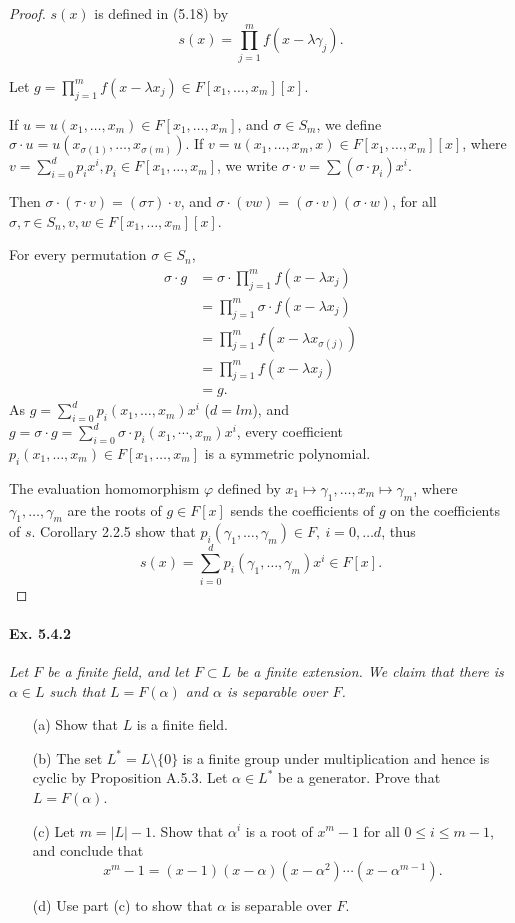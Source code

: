 \documentclass[11pt,a4paper]{article}
\begin{document}
\begin{proof}
$s(x)$ is defined in (5.18) by
 $$s(x) =\prod_{j=1}^m f(x-\lambda \gamma_j).$$

Let $g= \prod\limits_{j=1}^m f(x-\lambda x_j) \in F[x_1,\ldots,x_m][x]$.

If $u = u(x_1,\ldots,x_m) \in F[x_1,\ldots,x_m]$, and $\sigma \in S_m$, we define $\sigma \cdot u =u(x_{\sigma(1)},\ldots,x_{\sigma(m)})$. If $v =u(x_1,\ldots,x_m,x) \in F[x_1,\ldots,x_m][x]$, where $v = \sum\limits_{i=0}^d p_i x^i, p_i \in F[x_1,\ldots,x_m]$, we write $\sigma \cdot v = \sum (\sigma \cdot p_i) x^i$. 

Then $\sigma\cdot(\tau \cdot  v )= (\sigma \tau) \cdot v$, and $\sigma\cdot (vw) = (\sigma\cdot v) (\sigma\cdot w)$, for all $\sigma,\tau \in S_n, v,w \in F[x_1,\ldots,x_m][x]$.

For every permutation $\sigma \in S_n$, 
\begin{align*}
\sigma \cdot g &= \sigma \cdot  \prod_{j=1}^m f(x-\lambda x_j)\\
&= \prod_{j=1}^m \sigma \cdot f(x-\lambda x_j)\\
&=\prod_{j=1}^m f(x-\lambda x_{\sigma(j)})\\
&=\prod_{j=1}^m f(x-\lambda x_j)\\
&=g.
\end{align*}
As $g = \sum\limits_{i=0}^d p_i(x_1,\ldots,x_m) x^i$ ($d = lm$), and $g = \sigma \cdot g = \sum\limits_{i=0}^d \sigma \cdot p_i(x_1,\cdots,x_m) x^i$, every coefficient $p_i(x_1,\ldots,x_m)\in F[x_1,\ldots,x_m]$ is a symmetric polynomial. 

The evaluation homomorphism $\varphi$ defined by $x_1\mapsto \gamma_1,\ldots, x_m \mapsto \gamma_m$, where $\gamma_1,\ldots,\gamma_m$ are the roots of $g \in F[x]$ sends the coefficients of $g$ on the coefficients of $s$. Corollary 2.2.5 show that $p_i(\gamma_1,\dots,\gamma_m) \in F,\  i=0,\ldots d$, thus $$s(x) =\sum\limits_{i=0}^d p_i(\gamma_1,\ldots,\gamma_m) x^i \in F[x].$$
\end{proof}

\paragraph{Ex. 5.4.2}

{\it Let $F$ be a finite field, and let $F \subset L$ be a finite extension. We claim that there is $\alpha \in L$ such that $L = F(\alpha)$ and $\alpha$ is separable over $F$.
\begin{enumerate}
\item[(a)] Show that $L$ is a finite field.
\item[(b)] The set $L^* = L \setminus \{0\}$ is a finite group under multiplication and hence is cyclic by Proposition A.5.3. Let $\alpha \in L^*$ be a generator. Prove that $L = F(\alpha)$.
\item[(c)] Let $m = |L| - 1$. Show that $\alpha^i$ is a root of $x^m-1$ for all $0\leq i\leq m-1$, and conclude that
$$x^m-1 = (x-1)(x-\alpha)(x-\alpha^2)\cdots(x-\alpha^{m-1}).$$
\item[(d)] Use part (c) to show that $\alpha$ is separable over $F$.
\end{enumerate}
}
\end{document}

